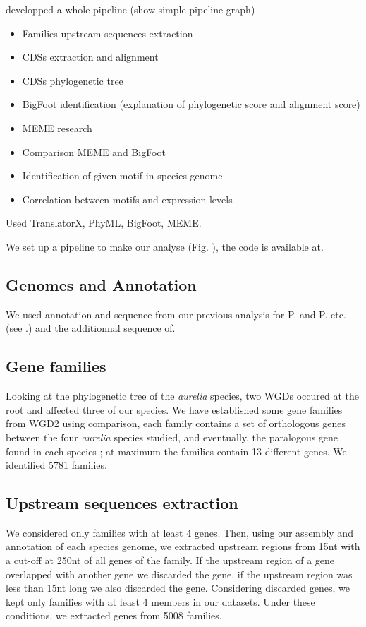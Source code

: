 developped a whole pipeline (show simple pipeline graph)
\begin{itemize}
\item Families upstream sequences extraction
\item CDSs extraction and alignment
\item CDSs phylogenetic tree
\item BigFoot identification (explanation of phylogenetic score and alignment score)
\item MEME research
\item Comparison MEME and BigFoot
\item Identification of given motif in species genome
\item Correlation between motifs and expression levels
\end{itemize}

Used TranslatorX, PhyML, BigFoot, MEME.

We set up a pipeline to make our analyse (Fig. ), the code is available at.

\subsection{Genomes and Annotation}

We used annotation and sequence from our previous analysis for P. and P. etc. (see .) and the additionnal sequence of.

\subsection{Gene families}

Looking at the phylogenetic tree of the \textit{aurelia} species, two WGDs occured at the root and affected three of our species. We have established some gene families from WGD2 using comparison, each family contains a set of orthologous genes between the four \textit{aurelia} species studied, and eventually, the paralogous gene found in each species ; at maximum the families contain 13 different genes. We identified 5781 families.

\subsection{Upstream sequences extraction}

We considered only families with at least 4 genes. Then, using our assembly and annotation of each species genome, we extracted upstream regions from 15nt with a cut-off at 250nt of all genes of the family. If the upstream region of a gene overlapped with another gene we discarded the gene, if the upstream region was less than 15nt long we also discarded the gene. Considering discarded genes, we kept only families with at least 4 members in our datasets. Under these conditions, we extracted genes from 5008 families.

